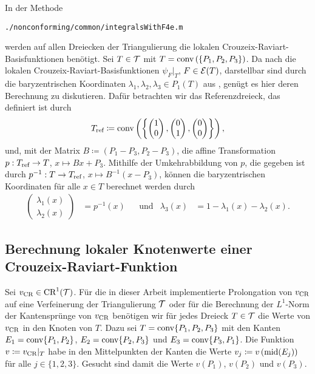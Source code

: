 In der Methode
\begin{center}
  \texttt{./nonconforming/common/integralsWithF4e.m}
\end{center}
werden auf allen Dreiecken der Triangulierung die lokalen
Crouzeix-Raviart-Basis\-funk\-tio\-nen benötigt. 
Sei $T\in\mathcal{T}$ mit $T=\textup{conv}\left(\{P_1,P_2,P_3\}\right)$.
Da nach  die lokalen
Crouzeix-Raviart-Basisfunktionen $\psi_{F}|_T$, $F\in\mathcal{E}(T)$, darstellbar
sind durch die baryzentrischen Koordinaten $\lambda_1,\lambda_2,\lambda_3\in
P_1(T)$ aus , genügt es hier deren
Berechnung zu diskutieren.
Dafür betrachten wir das Referenzdreieck, das definiert ist durch
\begin{align*}
  T_\textup{ref} \coloneqq
  \textup{conv}\left(\left\{
  \begin{pmatrix}
   1\\0 
  \end{pmatrix},
  \begin{pmatrix}
   0\\1 
  \end{pmatrix},
  \begin{pmatrix}
   0\\0 
  \end{pmatrix}
  \right\}\right),
\end{align*}
und, mit der Matrix $B\coloneqq (P_1-P_3,P_2-P_3)$, die affine Transformation
$p:T_\textup{ref} \to T$, $x \mapsto Bx+P_3$. 
Mithilfe der Umkehrabbildung von $p$, die gegeben ist durch $p^{-1}:T\to T_\textup{ref}$,
$x\mapsto B^{-1}(x-P_3)$, können die baryzentrischen Koordinaten für alle $x\in
T$ berechnet werden durch 
\begin{align*}
  \begin{pmatrix}
    \lambda_1(x)\\
    \lambda_2(x)
  \end{pmatrix}
  &=
  p^{-1}(x) &&\text{und}
  &\lambda_3(x)
  &=1-\lambda_1(x)-\lambda_2(x).
\end{align*}


\subsection{Berechnung lokaler Knotenwerte einer Crouzeix-Raviart-Funktion}
\label{sec:localNodalValuesCR}

Sei $v_\textup{CR}\in\textup{CR}^1(\mathcal{T})$.
Für die in dieser Arbeit implementierte Prolongation von $v_\textup{CR}$ auf eine
Verfeinerung der Triangulierung $\mathcal{T}$ oder für die Berechnung der $L^1$-Norm
der Kantensprünge von $v_\textup{CR}$ benötigen wir für jedes Dreieck $T\in\mathcal{T}$ die
Werte von $v_\textup{CR}$ in den Knoten von $T$. 
Dazu sei $T = \textup{conv}\{P_1, P_2, P_3\}$ mit den Kanten
$E_1 = \textup{conv}\{P_1,P_2\}$, $E_2 = \textup{conv}\{P_2,P_3\}$ und $E_3 =
\textup{conv}\{P_3,P_1\}$. 
Die Funktion $v\coloneqq v_\textup{CR}|_T$ habe in den Mittelpunkten der Kanten die Werte
$v_j\coloneqq v\left(\textup{mid}(E_j)\right)$ für alle $j\in\{1,2,3\}$. 
Gesucht sind damit die Werte $v(P_1)$, $v(P_2)$ und $v(P_3)$.

